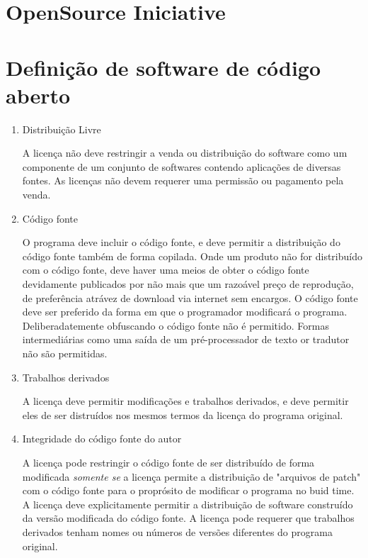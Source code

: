 \documentclass[12pt, a4paper]{report}
\begin{document}
\section{OpenSource Iniciative}

\section{Definição de software de código aberto}

\begin{enumerate}

  \item{Distribuição Livre}

    A licença não deve restringir a venda ou distribuição do software como um componente de um conjunto de softwares contendo aplicações de diversas fontes. As licenças não devem requerer uma permissão ou pagamento pela venda.

  \item{Código fonte}

    O programa deve incluir o código fonte, e deve permitir a distribuição do código fonte também de forma copilada. Onde um produto não for distribuído com o código fonte, deve haver uma meios de obter o código fonte devidamente publicados por não mais que um razoável preço de reprodução, de preferência atrávez de download via internet sem encargos. O código fonte deve ser preferido da forma em que o programador modificará o programa. Deliberadatemente obfuscando o código fonte não é permitido. Formas intermediárias como uma saída de um pré-processador de texto or tradutor não são permitidas.

  \item{Trabalhos derivados}

    A licença deve permitir modificações e trabalhos derivados, e deve permitir eles de ser distruídos nos mesmos termos da licença do programa original.

  \item{Integridade do código fonte do autor}

    A licença pode restringir o código fonte de ser distribuído de forma modificada \emph{somente se} a licença permite a distribuição de "arquivos de patch" com o código fonte para o proprósito de modificar o programa no buid time. A licença deve explicitamente permitir a distribuição de software construído da versão modificada do código fonte. A licença pode requerer que trabalhos derivados tenham nomes ou números de versões diferentes do programa original.


\end{enumerate}
\end{document}
